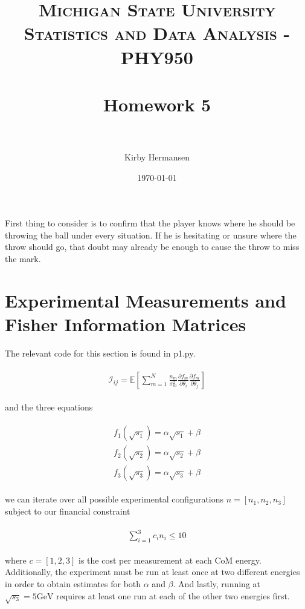 \documentclass[paper=a4, fontsize=11pt]{scrartcl} %
\title{	
\normalfont \normalsize 
\textsc{Michigan State University} \\ [25pt] %
\textsc{Statistics and Data Analysis - PHY950} \\ [23pt]
\horrule{0.5pt} \\[0.4cm] %
\huge Homework 5 \\ %
\horrule{2pt} \\[0.5cm] %
}
\author{Kirby Hermansen} %
\date{\normalsize\today} %
\numberwithin{equation}{section} %
\numberwithin{figure}{section} %
\numberwithin{table}{section} %
\numberwithin{equation}{subsection}
\begin{document}
\maketitle %



First thing to consider is to confirm that the player knows where he should be throwing the ball under every situation. If he is hesitating or unsure where the throw should go, that doubt may already be enough to cause the throw to miss the mark.



\section{Experimental Measurements and Fisher Information Matrices}
The relevant code for this section is found in p1.py.

\begin{align}
\begin{split}
\mathcal{I}_{ij} = \mathbb{E}\left[\sum_{m=1}^N \frac{n_m}{\sigma_m^2} \frac{\partial f_m}{\partial \theta_i}  \frac{\partial f_m}{\partial \theta_j}\right]
\end{split}
\end{align}

and the three equations

\begin{align}
\begin{split}
f_1(\sqrt{s_1}) = \alpha \sqrt{s_1} + \beta
\\f_2(\sqrt{s_2}) = \alpha \sqrt{s_2} + \beta
\\f_3(\sqrt{s_3}) = \alpha \sqrt{s_3} + \beta
\end{split}
\end{align}

we can iterate over all possible experimental configurations $n = [n_1, n_2, n_3]$ subject to our financial constraint

\begin{align}
\begin{split}
\sum_{i=1}^3 c_i n_i \leq 10
\end{split}
\end{align}

where $c = [1,2,3]$ is the cost per measurement at each CoM energy. Additionally, the experiment must be run at least once at two different energies in order to obtain estimates for both $\alpha$ and $\beta$. And lastly, running at $\sqrt{s_3} = 5 \textrm{GeV}$ requires at least one run at each of the other two energies first.
\end{document}

